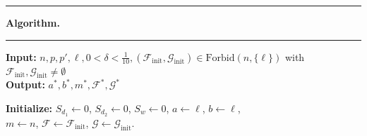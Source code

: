 \documentclass[10pt]{amsart}
\theoremstyle{remark}
\newcommand{\Fcal}{\mathcal{F}}
\newcommand{\Gcal}{\mathcal{G}}
\begin{document}
\begin{algorithm}
\hrule
\vspace{0.11cm}

\textbf{Algorithm.}

\vspace{0.1cm}
\hrule
\BlankLine

\textbf{Input:} $n,p,p',\ell,0<\delta<\frac{1}{10},
(\Fcal_{\mathrm{init}}, \Gcal_{\mathrm{init}})\in\mathrm{Forbid}(n,\{\ell\})$
with $\Fcal_{\mathrm{init}}, \Gcal_{\mathrm{init}}\neq\emptyset$ \\
\textbf{Output:} $a^*,b^*,m^*, \Fcal^*, \Gcal^*$
\BlankLine

\textbf{Initialize:} $S_{d_1}\leftarrow 0$, $S_{d_2}\leftarrow 0$, $S_{w}\leftarrow 0$,
$a\leftarrow \ell$, $b\leftarrow \ell$, \\
\hspace{1.71cm} $m\leftarrow n$, $\Fcal\leftarrow\Fcal_{\mathrm{init}}$, $\Gcal\leftarrow\Gcal_{\mathrm{init}}$.
\BlankLine


\end{algorithm}
\end{document}
